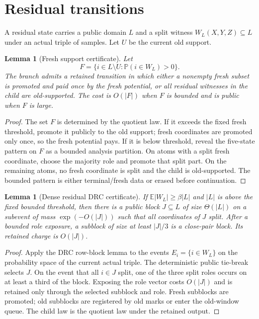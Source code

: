 \documentclass[11pt]{article}
\newtheorem{lemma}[theorem]{Lemma}
\theoremstyle{remark}
\newcommand{\E}{\mathbb E}
\newcommand{\Prob}{\mathbb P}
\begin{document}
\section{Residual transitions}\label{app:residual}

A residual state carries a public domain $L$ and a split witness $W_L(X,Y,Z)\subseteq L$ under an actual triple of samples.  Let $U$ be the current old support.

\begin{lemma}[Fresh support certificate]\label{lem:app-fresh}
Let
\[
        F=\{i\in L\setminus U:\Prob(i\in W_L)>0\}.
\]
The branch admits a retained transition in which either a nonempty fresh subset is promoted and paid once by the fresh potential, or all residual witnesses in the child are old-supported.  The cost is $O(|F|)$ when $F$ is bounded and is public when $F$ is large.
\end{lemma}

\begin{proof}
The set $F$ is determined by the quotient law.  If it exceeds the fixed fresh threshold, promote it publicly to the old support; fresh coordinates are promoted only once, so the fresh potential pays.  If it is below threshold, reveal the five-state pattern on $F$ as a bounded analysis partition.  On atoms with a split fresh coordinate, choose the majority role and promote that split part.  On the remaining atoms, no fresh coordinate is split and the child is old-supported.  The bounded pattern is either terminal/fresh data or erased before continuation.
\end{proof}

\begin{lemma}[Dense residual DRC certificate]\label{lem:app-dense}
If $\E|W_L|\ge \beta |L|$ and $|L|$ is above the fixed bounded threshold, then there is a public block $J\subseteq L$ of size $\Theta(|L|)$ on a subevent of mass $\exp(-O(|J|))$ such that all coordinates of $J$ split.  After a bounded role exposure, a subblock of size at least $|J|/3$ is a close-pair block.  Its retained charge is $O(|J|)$.
\end{lemma}

\begin{proof}
Apply the DRC row-block lemma to the events $E_i=\{i\in W_L\}$ on the probability space of the current actual triple.  The deterministic public tie-break selects $J$.  On the event that all $i\in J$ split, one of the three split roles occurs on at least a third of the block.  Exposing the role vector costs $O(|J|)$ and is retained only through the selected subblock and role.  Fresh subblocks are promoted; old subblocks are registered by old marks or enter the old-window queue.  The child law is the quotient law under the retained output.
\end{proof}
\end{document}
